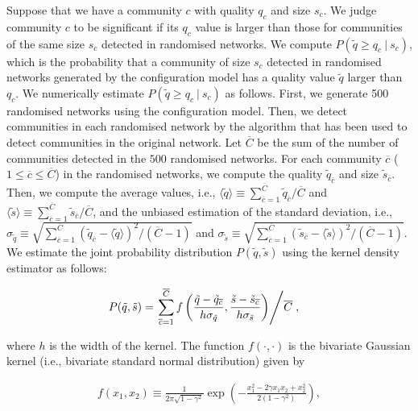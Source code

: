 \documentclass[fleqn,10pt]{wlscirep}
\newcommand\given[1][]{\:#1\vert\:}
\begin{document}
Suppose that we have a community $c$ with quality $q_c$ and size $s_c$. 
We judge community $c$ to be significant if its $q_c$ value is larger than those for communities of the same size $s_c$ detected in randomised networks. 
We compute  $P(\tilde q \geq q_c \given s_c )$, which is the probability that a community of size $s_c$ detected in randomised networks generated by the configuration model has a quality value $\tilde q$ larger than $q_c$.
We numerically estimate $P(\tilde q \geq q_c \given s_c)$ as follows.
First, we generate 500 randomised networks using the configuration model.  
Then, we detect communities in each randomised network by the algorithm that has been used to detect communities in the original network.
Let $\overline C$ be the sum of the number of communities detected in the $500$ randomised networks.
For each community $\overline{c}$ ($1 \leq \overline{c} \leq \overline{C}$) in the randomised networks, we compute the quality $\tilde q_{\overline{c}}$ and size $\tilde s_{\overline{c}}$.
Then, we compute the average values, i.e., $\langle \tilde q \rangle \equiv \sum_{{\overline{c}}=1}^{\overline{C}} \tilde q_{\overline{c}} / \overline{C}$ and $\langle \tilde s \rangle \equiv \sum_{{\overline{c}}=1}^{\overline{C}} \tilde s_{\overline{c}} / \overline{C}$, and 
the unbiased estimation of the standard deviation, i.e., $\sigma_{\tilde q} \equiv \sqrt{\sum_{{\overline{c}}=1} ^{\overline{C}}  (\tilde q_{{\overline{c}}} -\langle \tilde q\rangle )^2 / (\overline{C}-1)}$ and $\sigma_{\tilde s} \equiv \sqrt{\sum_{{\overline{c}}=1} ^{\overline{C}}  (\tilde s_{{\overline{c}}} -\langle \tilde s\rangle )^2 / (\overline{C}-1)}$.
We estimate the joint probability distribution $P(\tilde q, \tilde s)$ using the kernel density estimator \cite{Wand1993} as follows: 
\begin{linenomath}
\begin{align}
    \label{eq:joint}
    P(\tilde q, \tilde s) &= \left.\sum_{{\overline{c}}=1} ^{\overline{C}} f\left( \frac{\tilde q - \tilde q_{{\overline{c}}}}{h\sigma_{\tilde q}}, \frac{\tilde s - \tilde s_{{\overline{c}}} }{h\sigma_{\tilde s}} \right) \middle/  \overline{C} \right.,
\end{align}
\end{linenomath}
where $h$ is the width of the kernel.
The function $f(\cdot, \cdot)$ is the bivariate Gaussian kernel (i.e., bivariate standard normal distribution) given by  
\begin{linenomath}
\begin{align}
    \label{eq:bivariate}
    f(x_1,x_2) \equiv \frac{1}{2\pi \sqrt{1-\gamma ^2}} \exp\left( -\frac{ x_1 ^2  - 2 \gamma x_1 x_2 + x_2 ^2 }{2\left(1-\gamma^2 \right)}  \right), 
\end{align}
\end{linenomath}
\end{document}
